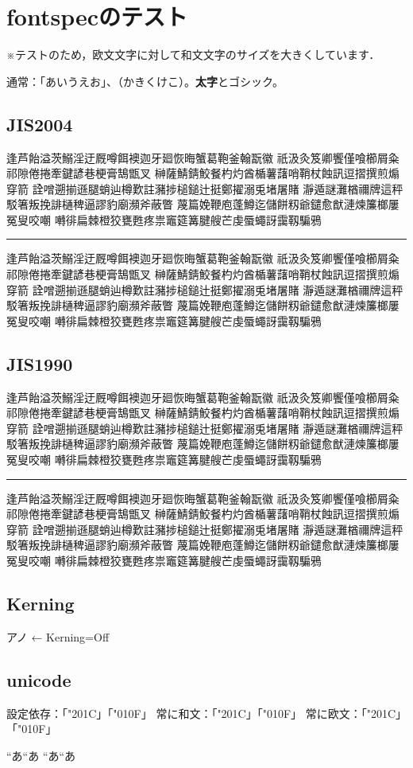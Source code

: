 \documentclass{article}
\begin{document}
\section{fontspecのテスト}

※テストのため，欧文文字に対して和文文字のサイズを大きくしています．

\noindent 通常：「あいうえお」、（かきくけこ）。{\bf 太字}と{\gt ゴシック}。



\def\R{%
逢芦飴溢茨鰯淫迂厩噂餌襖迦牙廻恢晦蟹葛鞄釜翰翫徽
祇汲灸笈卿饗僅喰櫛屑粂祁隙倦捲牽鍵諺巷梗膏鵠甑叉
榊薩鯖錆鮫餐杓灼酋楯薯藷哨鞘杖蝕訊逗摺撰煎煽穿箭
詮噌遡揃遜腿蛸辿樽歎註瀦捗槌鎚辻挺鄭擢溺兎堵屠賭
瀞遁謎灘楢禰牌這秤駁箸叛挽誹樋稗逼謬豹廟瀕斧蔽瞥
蔑篇娩鞭庖蓬鱒迄儲餅籾爺鑓愈猷漣煉簾榔屢冤叟咬嘲
囀徘扁棘橙狡甕甦疼祟竈筵篝腱艘芒虔蜃蠅訝靄靱騙鴉
}

\subsection{JIS2004}
\R

\medskip\hrule\medskip
\vbox{\zw\tate{}\zw\R}



\subsection{JIS1990}
{\ipajisninety
\R

\medskip\hrule\medskip
\vbox{\zw\tate{}\zw\R}}

\subsection{Kerning}
{

アノ ← Kerning=Off

}

\subsection{unicode}

設定依存：「\char"201C」「\char"010F」%
常に和文：「\ltjjachar"201C」「\ltjjachar"010F」%
常に欧文：「\ltjalchar"201C」「\ltjalchar"010F」%

{\let\char=\ltjalchar\textquotedblleft}あ\textquotedblleft あ%
{\let\char=\ltjjachar\textquotedblleft}あ“あ
\end{document}
